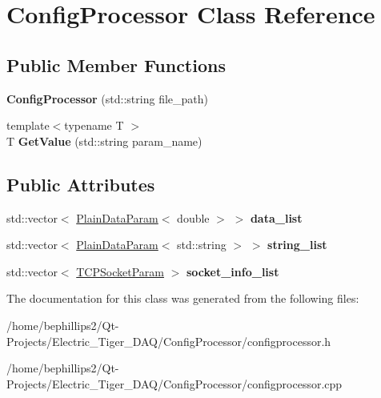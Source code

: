 \hypertarget{class_config_processor}{}\section{Config\+Processor Class Reference}
\label{class_config_processor}
\subsection*{Public Member Functions}
\begin{DoxyCompactItemize}
\item 
{\bfseries Config\+Processor} (std\+::string file\+\_\+path)\hypertarget{class_config_processor_a28b19765419c2b6ddb1b3327b711f4e7}{}\label{class_config_processor_a28b19765419c2b6ddb1b3327b711f4e7}

\item 
{\footnotesize template$<$typename T $>$ }\\T {\bfseries Get\+Value} (std\+::string param\+\_\+name)\hypertarget{class_config_processor_a511cd925379b98cc4fd85d320bdb490d}{}\label{class_config_processor_a511cd925379b98cc4fd85d320bdb490d}

\end{DoxyCompactItemize}
\subsection*{Public Attributes}
\begin{DoxyCompactItemize}
\item 
std\+::vector$<$ \hyperlink{struct_plain_data_param}{Plain\+Data\+Param}$<$ double $>$ $>$ {\bfseries data\+\_\+list}\hypertarget{class_config_processor_a28ccb85933245a036982ab22a3138b17}{}\label{class_config_processor_a28ccb85933245a036982ab22a3138b17}

\item 
std\+::vector$<$ \hyperlink{struct_plain_data_param}{Plain\+Data\+Param}$<$ std\+::string $>$ $>$ {\bfseries string\+\_\+list}\hypertarget{class_config_processor_a9401084ab2e2cd556eb1c3844eefd273}{}\label{class_config_processor_a9401084ab2e2cd556eb1c3844eefd273}

\item 
std\+::vector$<$ \hyperlink{struct_t_c_p_socket_param}{T\+C\+P\+Socket\+Param} $>$ {\bfseries socket\+\_\+info\+\_\+list}\hypertarget{class_config_processor_a7f9bacfd051f7f50440f1325c96a99e6}{}\label{class_config_processor_a7f9bacfd051f7f50440f1325c96a99e6}

\end{DoxyCompactItemize}


The documentation for this class was generated from the following files\+:\begin{DoxyCompactItemize}
\item 
/home/bephillips2/\+Qt-\/\+Projects/\+Electric\+\_\+\+Tiger\+\_\+\+D\+A\+Q/\+Config\+Processor/configprocessor.\+h\item 
/home/bephillips2/\+Qt-\/\+Projects/\+Electric\+\_\+\+Tiger\+\_\+\+D\+A\+Q/\+Config\+Processor/configprocessor.\+cpp\end{DoxyCompactItemize}
